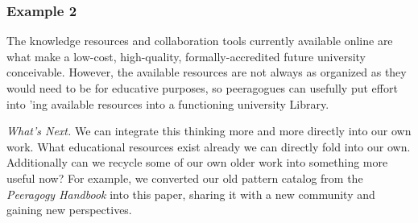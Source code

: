 \vspace{.05cm}

\subsubsection*{Example 2}
The knowledge resources and collaboration tools currently available online
are what make a low-cost, high-quality, formally-accredited future university
conceivable.  However, the available resources are not always as
organized as they would need to be for educative purposes, so peeragogues can usefully put
effort into 'ing available
resources into a functioning university Library.


\begin{framed}
\noindent 
\emph{What's Next.}
We can integrate this thinking more and more directly into our own work. What educational resources exist already we can directly fold into our own. Additionally can we recycle some of our own older work into something more useful now? For example, we converted our old pattern catalog from the \emph{Peeragogy Handbook} into this paper, sharing it with a new community and gaining new perspectives.
\end{framed}



    
    
